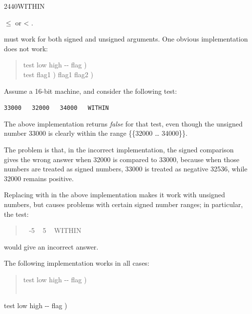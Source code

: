 \begin{worddef}{2440}{WITHIN}
\begin{rationale}
\begin{center}
			 $\le$  or  < .
		\end{center}
		 must work for both signed and unsigned arguments.
		One obvious implementation does not work:
		\begin{quote}\ttfamily
			\word{:}   test low high -{}- flag ) \\
			\tab {}     test flag1 )
				    flag1 flag2 )
				 \\
			\word{;}
		\end{quote}
		Assume a 16-bit machine, and consider the following test:

		\tab \texttt{33000 ~ 32000 ~ 34000 ~ WITHIN}

		The above implementation returns \emph{false} for that test,
		even though the unsigned number 33000 is clearly within the
		range \{\{32000 {\ldots} 34000\}\}.

		The problem is that, in the incorrect implementation, the
		signed comparison  gives the wrong answer when 32000
		is compared to 33000, because when those numbers are treated
		as signed numbers, 33000 is treated as negative 32536, while
		32000 remains positive.

		Replacing  with  in the above implementation
		makes it work with unsigned numbers, but causes problems with
		certain signed number ranges; in particular, the test:
		\begin{quote} ~ -5 ~ 5 ~ WITHIN
		\end{quote}
		would give an incorrect answer.

		The following implementation works in all cases:
		\begin{quote}\ttfamily
			\word{:}   test low high -{}- flag ) \\
			\tab ~ \word{-}  \word{-}   \\
			\word{;}
		\end{quote}
	\end{rationale}

	\begin{implement} %
		\word{:}   test low high -{}- flag ) \\
		\tab {} \word{-}  \word{-}   \\
		\word{;}
	\end{implement}
\end{worddef}

